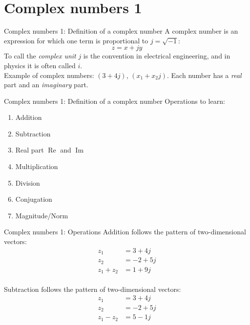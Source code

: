 \documentclass{beamer}
\begin{document}
\section{Complex numbers 1}

\begin{frame}{Complex numbers 1: Definition of a complex number}
A \alert{complex number} is an expression for which one term is proportional to $j = \sqrt{-1}$:
\begin{equation}
z = x + jy
\end{equation}
To call the \textit{complex unit} $j$ is the convention in electrical engineering, and in physics it is often called $i$. \\ \vspace{0.5cm}
Example of complex numbers: $(3+4j)$, $(x_1 + x_2 j)$.  Each number has a \textit{real} part and an \textit{imaginary} part.
\end{frame}

\begin{frame}{Complex numbers 1: Definition of a complex number}
Operations to learn:
\begin{enumerate}
\item Addition
\item Subtraction
\item Real part $\operatorname{Re}$ and $\operatorname{Im}$
\item Multiplication
\item Division
\item Conjugation
\item Magnitude/Norm
\end{enumerate}
\end{frame}

\begin{frame}{Complex numbers 1: Operations}
Addition follows the pattern of two-dimensional vectors:
\begin{align}
z_1 &= 3+4j \\
z_2 &= -2+5j \\
z_1 + z_2 &= 1+9j
\end{align} \\
Subtraction follows the pattern of two-dimensional vectors:
\begin{align}
z_1 &= 3+4j \\
z_2 &= -2+5j \\
z_1 - z_2 &= 5-1j
\end{align}
\end{frame}
\end{document}
